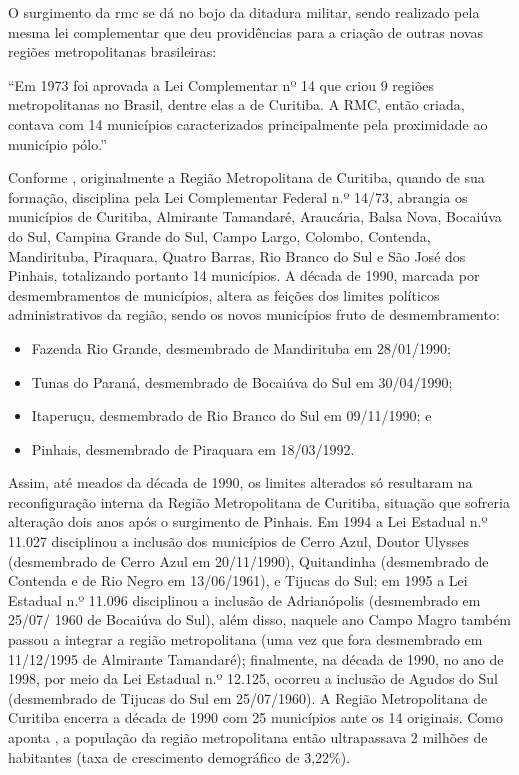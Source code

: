 	O surgimento da \glsdesc{rmc} se dá no bojo da ditadura militar, sendo realizado pela mesma lei complementar que deu providências para a criação de outras novas regiões metropolitanas brasileiras:
	
	\begin{citacao}
		``Em  1973  foi  aprovada  a  Lei  Complementar  nº  14  que  criou  9  regiões metropolitanas no Brasil, dentre elas a de Curitiba. A RMC, então criada, contava com 14 municípios caracterizados principalmente pela proximidade ao município pólo.'' 
	\end{citacao}
	
	Conforme , originalmente a Região Metropolitana de Curitiba, quando de sua formação, disciplina pela Lei Complementar Federal n.º 14/73, abrangia os municípios de Curitiba, Almirante Tamandaré, Araucária, Balsa Nova, Bocaiúva do Sul, Campina Grande do Sul, Campo Largo, Colombo, Contenda, Mandirituba, Piraquara, Quatro Barras, Rio Branco do Sul e São José dos Pinhais, totalizando portanto 14 municípios. A década de 1990, marcada por desmembramentos de municípios, altera as feições dos limites políticos administrativos da região, sendo os novos municípios fruto de desmembramento:
	
	\begin{itemize}
		\item Fazenda Rio Grande, desmembrado de Mandirituba em 28/01/1990;
		\item Tunas do Paraná, desmembrado de Bocaiúva do Sul em 30/04/1990;
		\item Itaperuçu, desmembrado de Rio Branco do Sul em 09/11/1990; e
		\item Pinhais, desmembrado de Piraquara em 18/03/1992.
	\end{itemize}
	
	Assim, até meados da década de 1990, os limites alterados só resultaram na reconfiguração interna da Região Metropolitana de Curitiba, situação que sofreria alteração dois anos após o surgimento de Pinhais. Em 1994 a Lei Estadual n.º 11.027 disciplinou a inclusão dos municípios de Cerro Azul, Doutor Ulysses (desmembrado de Cerro Azul em 20/11/1990), Quitandinha (desmembrado de Contenda e de Rio Negro em 13/06/1961), e Tijucas do Sul; em 1995 a Lei Estadual n.º 11.096 disciplinou a inclusão de Adrianópolis (desmembrado em 25/07/ 1960 de Bocaiúva do Sul), além disso, naquele ano Campo Magro também passou a integrar a região metropolitana (uma vez que fora desmembrado em 11/12/1995 de Almirante Tamandaré); finalmente, na década de 1990, no ano de 1998, por meio da Lei Estadual n.º 12.125, ocorreu a inclusão de Agudos do Sul (desmembrado de Tijucas do Sul em 25/07/1960). A Região Metropolitana de Curitiba encerra a década de 1990 com 25 municípios ante os 14 originais. Como aponta , a população da região metropolitana então ultrapassava 2 milhões de habitantes (taxa de crescimento demográfico de 3,22\%).
	
